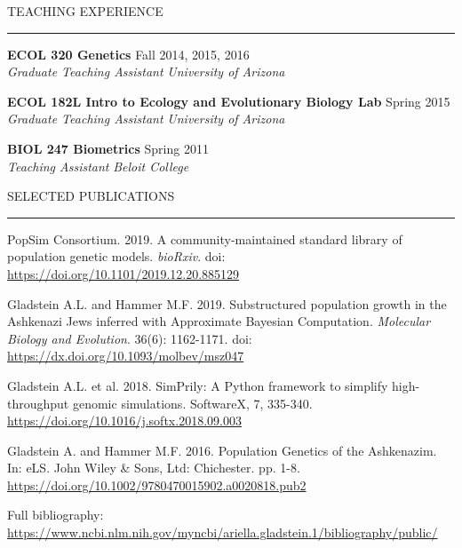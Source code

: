\documentclass{resume} %
\renewenvironment{rSection}[1]{
\sectionskip
\textcolor{RoyalPurple}{\MakeUppercase{#1}}
\sectionlineskip
\hrule
\begin{list}{}{
\setlength{\leftmargin}{1.5em}
}
\item[]
}{
\end{list}
}
\begin{document}
\begin{rSection}{Teaching Experience}

{\bf ECOL 320 Genetics} \hfill Fall 2014, 2015, 2016 \\ 
{\em Graduate Teaching Assistant} \hfill {\em University of Arizona}

{\bf ECOL 182L Intro to Ecology and Evolutionary Biology Lab} \hfill Spring 2015 \\ 
{\em Graduate Teaching Assistant} \hfill {\em University of Arizona}

{\bf BIOL 247 Biometrics} \hfill Spring 2011 \\ 
{\em Teaching Assistant} \hfill {\em Beloit College}


\end{rSection}



\begin{rSection}{Selected Publications}

\item PopSim Consortium. 2019. A community-maintained standard library of population genetic models. \textit{bioRxiv}. doi: \url{https://doi.org/10.1101/2019.12.20.885129}
\item Gladstein A.L. and Hammer M.F. 2019. Substructured population growth in the Ashkenazi Jews inferred with Approximate Bayesian Computation. \textit{Molecular Biology and Evolution}. 36(6): 1162-1171. doi: \url{https://dx.doi.org/10.1093/molbev/msz047}
\item Gladstein A.L. et al. 2018. SimPrily: A Python framework to simplify high-throughput genomic simulations. SoftwareX, 7, 335-340. \url{https://doi.org/10.1016/j.softx.2018.09.003}
\item Gladstein A. and Hammer M.F. 2016. Population Genetics of the Ashkenazim. In: eLS. John Wiley \& Sons, Ltd: Chichester. pp. 1-8. \url{https://doi.org/10.1002/9780470015902.a0020818.pub2}

Full bibliography: \url{https://www.ncbi.nlm.nih.gov/myncbi/ariella.gladstein.1/bibliography/public/}


\end{rSection}
\end{document}
